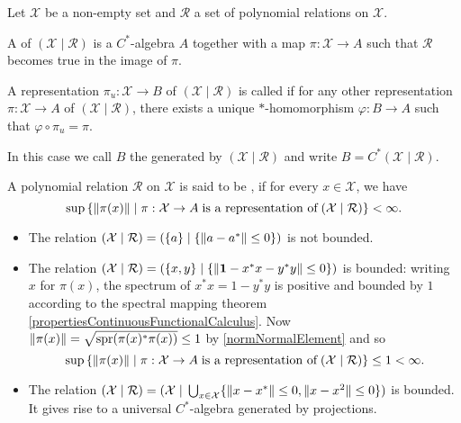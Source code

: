 \begin{definition}
Let $\mathcal{X}$ be a non-empty set and $\mathcal{R}$ a set of polynomial relations on $\mathcal{X}$.

A  of $(\mathcal{X}\;|\;\mathcal{R})$ is a $C^*$-algebra $A$ together with a map $\pi:\mathcal{X}\to A$ such that $\mathcal{R}$ becomes true in the image of $\pi$.

A representation $\pi_u:\mathcal{X}\to B$ of $(\mathcal{X}\;|\;\mathcal{R})$ is called  if for any other representation $\pi:\mathcal{X}\to A$ of $(\mathcal{X}\;|\;\mathcal{R})$, there exists a unique $*$-homomorphism $\varphi: B\to A$ such that $\varphi\circ \pi_u = \pi$.

In this case we call $B$ the  generated by $(\mathcal{X}\;|\;\mathcal{R})$ and write $B= C^*(\mathcal{X}\;|\;\mathcal{R})$.
\end{definition}

\begin{definition}
A polynomial relation $\mathcal{R}$ on $\mathcal{X}$ is said to be , if for every $x\in \mathcal{X}$, we have
\[ \sup\left\{ \lVert\pi(x)\rVert \;\middle|\; \pi:\mathcal{X}\to A\;\text{is a representation of}\;(\mathcal{X}\;|\;\mathcal{R}) \right\} < \infty. \] 
\end{definition}

\begin{example}
\begin{itemize}
\item The relation $(\mathcal{X}\;|\;\mathcal{R}) = (\{a\}\;|\;\{\lVert a-a^*\rVert\leq 0\})$ is not bounded.
\item The relation $(\mathcal{X}\;|\;\mathcal{R}) = (\{x,y\}\;|\;\{\lVert\boldsymbol{\mathrm{1}}-x^*x-y^*y\rVert\leq 0\})$ is bounded: writing $x$ for $\pi(x)$, the spectrum of $x^*x = 1-y^*y$ is positive and bounded by $1$ according to the spectral mapping theorem \ref{propertiesContinuousFunctionalCalculus}. Now $\lVert\pi(x)\rVert = \sqrt{\operatorname{spr}(\pi(x)^*\pi(x))} \leq 1$ by \ref{normNormalElement} and so
\[ \sup\left\{ \lVert\pi(x)\rVert \;\middle|\; \pi:\mathcal{X}\to A\;\text{is a representation of}\;(\mathcal{X}\;|\;\mathcal{R}) \right\} \leq 1 < \infty. \]
\item The relation $(\mathcal{X}\;|\;\mathcal{R}) = (\mathcal{X}\;|\;\bigcup_{x\in\mathcal{X}}\{\lVert x-x^*\rVert\leq 0,\lVert x-x^2\rVert\leq 0 \})$ is bounded. It gives rise to a universal $C^*$-algebra generated by projections.
\end{itemize}
\end{example}

